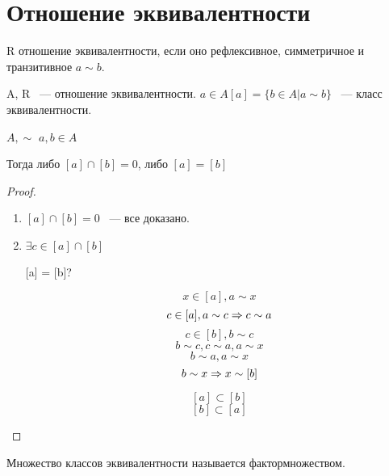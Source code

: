 ﻿\section{Отношение эквивалентности}

\begin{Def}
    R отношение эквивалентности, если оно рефлексивное, симметричное и транзитивное $a \sim b$.
    
    A, R ~--- отношение эквивалентности.
    $a \in A [a] = \{b \in A| a \sim b\}$ ~--- класс эквивалентности.  
\end{Def}

\begin{theorem}{}
$A,\sim$
$a, b \in A$

Тогда либо $[a]\cap [b] = 0$, либо $[a] = [b]$ 
\end{theorem}

\begin{proof}
\begin{enumerate}
\item $[a] \cap [b] = 0$ ~--- все доказано.
\item $\exists c \in [a] \cap [b]$

[a] = [b]?

$$x \in [a], a \sim x$$
$$c \in [a], a \sim c \Rightarrow c \sim a$$
$$c \in [b], b \sim c$$
$$b \sim c, c \sim a, a \sim x$$
$$b \sim a, a \sim x$$
$$b \sim x \Rightarrow x \sim [b]$$

$$[a] \subset [b]$$
$$[b] \subset [a]$$
\end{enumerate}
\end{proof}

Множество классов эквивалентности называется фактормножеством.
